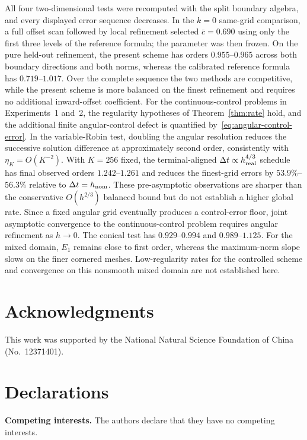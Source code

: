 \documentclass[11pt]{article}
\theoremstyle{definition}
\theoremstyle{remark}
\begin{document}
	All four two-dimensional tests were recomputed with the split boundary
	algebra, and every displayed error sequence decreases.  In the $k=0$
	same-grid comparison, a full offset scan followed by local refinement selected
	$\bar c=0.690$ using only the first three levels of the reference formula; the
	parameter was then frozen.  On the pure held-out refinement, the present
	scheme has orders $0.955$--$0.965$ across both boundary directions and both
	norms, whereas the calibrated reference formula has $0.719$--$1.017$.  Over
	the complete sequence the two methods are competitive, while the present
	scheme is more balanced on the finest refinement and requires no additional
	inward-offset coefficient.  For the continuous-control problems in
	Experiments~1 and~2, the regularity hypotheses of
	Theorem~\ref{thm:rate} hold, and the additional finite angular-control defect
	is quantified by~\eqref{eq:angular-control-error}.  In the variable-Robin
	test, doubling the angular resolution reduces the successive solution
	difference at approximately second order, consistently with
	$\eta_K=O(K^{-2})$.  With $K=256$ fixed, the terminal-aligned
	$\Delta t\propto h_{\rm real}^{4/3}$ schedule has final observed orders
	$1.242$--$1.261$ and reduces the finest-grid errors by $53.9\%$--$56.3\%$
	relative to $\Delta t=h_{\rm nom}$.  These pre-asymptotic observations are
	sharper than the conservative $O(h^{2/3})$ balanced bound but do not establish
	a higher global rate.  Since a fixed angular grid eventually produces a
	control-error floor, joint asymptotic convergence to the continuous-control
	problem requires angular refinement as $h\to0$.  The conical test has
	$0.929$--$0.994$ and $0.989$--$1.125$.  For the mixed domain, $E_1$ remains
	close to first order, whereas the maximum-norm slope slows on the finer
	cornered meshes.  Low-regularity rates for the controlled scheme and
	convergence on this nonsmooth mixed domain are not established here.
	
	\section*{Acknowledgments}
	This work was supported by the National Natural Science Foundation of China (No.~12371401).
	
	\section*{Declarations}
	
	\noindent\textbf{Competing interests.}
	The authors declare that they have no competing interests.
	
\end{document}

